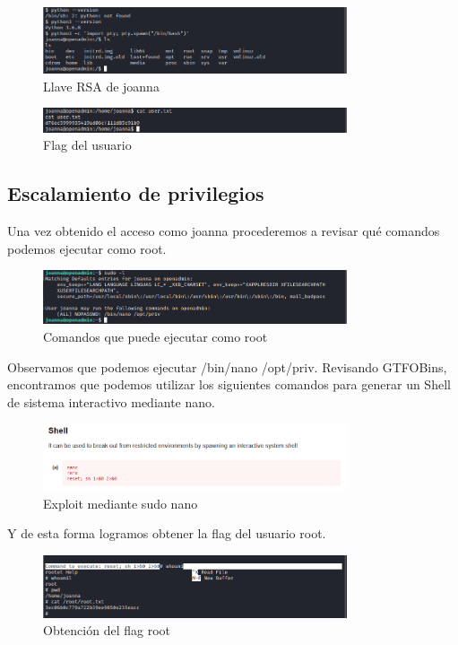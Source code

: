 \documentclass{article}
\begin{document}
\begin{figure}[h]
	\center
	\includegraphics[width=0.8\textwidth]{images/openadmin/17-alternativa2.png}
	\caption{Llave RSA de joanna}
\end{figure}

\begin{figure}[h]
	\center
	\includegraphics[width=0.8\textwidth]{images/openadmin/17-alternativa3.png}
	\caption{Flag del usuario}
\end{figure}

\subsection{Escalamiento de privilegios}

Una vez obtenido el acceso como joanna procederemos a revisar qué comandos podemos ejecutar como root.
\begin{figure}[h]
	\center
	\includegraphics[width=0.8\textwidth]{images/openadmin/18-sudol.png}
	\caption{Comandos que puede ejecutar como root}
\end{figure}

Observamos que podemos ejecutar /bin/nano /opt/priv. Revisando GTFOBins, encontramos que podemos utilizar los siguientes comandos para generar un Shell de sistema interactivo mediante nano.
\begin{figure}[h]
	\center
	\includegraphics[width=0.8\textwidth]{images/openadmin/19-gtfobins.png}
	\caption{Exploit mediante sudo nano}
\end{figure}

Y de esta forma logramos obtener la flag del usuario root.
\begin{figure}[h]
	\center
	\includegraphics[width=0.8\textwidth]{images/openadmin/20-privilegio.png}
	\caption{Obtención del flag root}
\end{figure}
\end{document}
